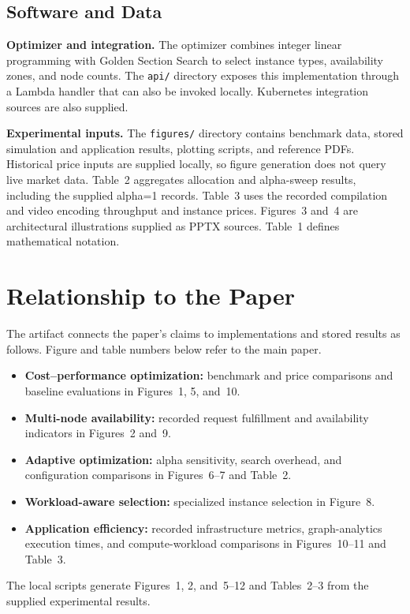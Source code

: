 \documentclass[sigconf,9pt,nonacm,balance=false]{acmart}
\newcommand{\pathcode}[1]{\nolinkurl{#1}}
\begin{document}
\subsection{Software and Data}
\textbf{Optimizer and integration.}
The optimizer combines integer linear programming with Golden Section
Search to select instance types, availability zones, and node counts.
The \pathcode{api/} directory exposes this implementation through a Lambda
handler that can also be invoked locally. Kubernetes integration sources
are also supplied.

\textbf{Experimental inputs.}
The \pathcode{figures/} directory contains benchmark data, stored simulation
and application results, plotting scripts, and reference PDFs. Historical
price inputs are supplied locally, so figure generation does not query live
market data. Table~2 aggregates allocation and alpha-sweep results, including
the supplied alpha=1 records. Table~3 uses the recorded compilation and video
encoding throughput and instance prices. Figures~3 and~4 are architectural
illustrations supplied as PPTX sources. Table~1 defines mathematical notation.

\section{Relationship to the Paper}
The artifact connects the paper's claims to implementations and stored
results as follows. Figure and table numbers below refer to the main paper.
\begin{itemize}
  \item \textbf{Cost--performance optimization:} benchmark and price
    comparisons and baseline evaluations in Figures~1, 5, and~10.
  \item \textbf{Multi-node availability:} recorded request fulfillment
    and availability indicators in Figures~2 and~9.
  \item \textbf{Adaptive optimization:} alpha sensitivity, search overhead,
    and configuration comparisons in Figures~6--7 and Table~2.
  \item \textbf{Workload-aware selection:} specialized instance selection
    in Figure~8.
  \item \textbf{Application efficiency:} recorded infrastructure metrics,
    graph-analytics execution times, and compute-workload comparisons in
    Figures~10--11 and Table~3.
\end{itemize}
The local scripts generate Figures~1, 2, and~5--12 and Tables~2--3
from the supplied experimental results.
\end{document}

